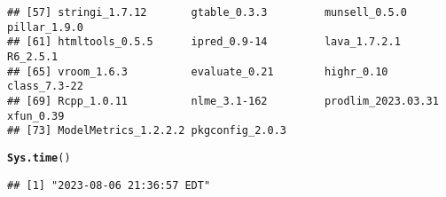 \documentclass{article}\usepackage[]{graphicx}\usepackage[]{xcolor}
\makeatletter
\newcommand{\hlstd}[1]{\textcolor[rgb]{0.345,0.345,0.345}{#1}}%
\newcommand{\hlkwd}[1]{\textcolor[rgb]{0.737,0.353,0.396}{\textbf{#1}}}%
\newenvironment{kframe}{%
 \def\at@end@of@kframe{}%
 \ifinner\ifhmode%
  \def\at@end@of@kframe{\end{minipage}}%
  \begin{minipage}{\columnwidth}%
 \fi\fi%
 \def\FrameCommand##1{\hskip\@totalleftmargin \hskip-\fboxsep
 \colorbox{shadecolor}{##1}\hskip-\fboxsep
     \hskip-\linewidth \hskip-\@totalleftmargin \hskip\columnwidth}%
 \MakeFramed {\advance\hsize-\width
   \@totalleftmargin\z@ \linewidth\hsize
   \@setminipage}}%
 {\par\unskip\endMakeFramed%
 \at@end@of@kframe}
\newenvironment{knitrout}{}{} %
\makeatother
\begin{document}
\begin{knitrout}
\begin{kframe}
\begin{verbatim}
## [57] stringi_1.7.12       gtable_0.3.3         munsell_0.5.0        pillar_1.9.0        
## [61] htmltools_0.5.5      ipred_0.9-14         lava_1.7.2.1         R6_2.5.1            
## [65] vroom_1.6.3          evaluate_0.21        highr_0.10           class_7.3-22        
## [69] Rcpp_1.0.11          nlme_3.1-162         prodlim_2023.03.31   xfun_0.39           
## [73] ModelMetrics_1.2.2.2 pkgconfig_2.0.3
\end{verbatim}
\begin{alltt}
\hlkwd{Sys.time}\hlstd{()}
\end{alltt}
\begin{verbatim}
## [1] "2023-08-06 21:36:57 EDT"
\end{verbatim}
\end{kframe}
\end{knitrout}
\end{document}
